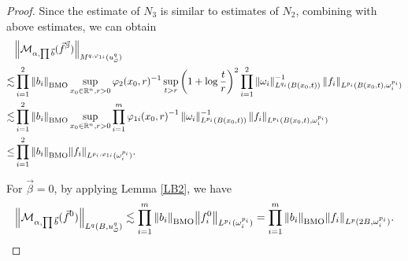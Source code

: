 \documentclass[11pt, twoside, leqno]{article}
\begin{document}
\begin{proof}[Proof]
	Since the estimate of $N_3$ is similar to estimates of $N_2$, combining with above estimates, we can obtain
	\begin{align}\label{ieq3}
	&{\left\| {{\mathcal{M}_{\alpha ,\prod {\vec b} }}({{\vec f}^{\vec \beta }})} \right\|_{{M^{q,{\varphi _{1i}}}}(u_{\vec \omega }^q)}}\notag\\
	\lesssim&\prod\limits_{i = 1}^2 {{{\left\| {{b_i}} \right\|}_{\rm BMO}}} \mathop {\sup }\limits_{{x_0} \in {\mathbb R^n},r > 0} {\varphi _2}{({x_0},r)^{ - 1}}\mathop {\sup }\limits_{t > r} {\left( {1 + \log \frac{t}{r}} \right)^2}\prod\limits_{i = 1}^2 {\left\| {{\omega _i}} \right\|_{{L^{{q_i}}}(B({x_0},t))}^{ - 1}{{\left\| {{f_i}} \right\|}_{{L^{{p_i}}}(B({x_0},t),\omega _i^{{p_i}})}}}\notag\\
	\lesssim&\prod\limits_{i = 1}^2 {{{\left\| {{b_i}} \right\|}_{\rm BMO}}} \mathop {\sup }\limits_{{x_0} \in {\mathbb R^n},r > 0} \prod\limits_{i = 1}^m {{\varphi _{1i}}{{({x_0},r)}^{ - 1}}\left\| {{\omega _i}} \right\|_{{L^{{p_i}}}(B({x_0},t))}^{ - 1}{{\left\| {{f_i}} \right\|}_{{L^{{p_i}}}(B({x_0},t),\omega _i^{{p_i}})}}}\notag\\
	\le&\prod\limits_{i = 1}^2 {{{\left\| {{b_i}} \right\|}_{\rm BMO}}{{\left\| {{f_i}} \right\|}_{{L^{{p_i},{\varphi _{1i}}}}(\omega _i^{{p_i}})}}}.
	\end{align}
	
	For $\vec \beta = 0$, by applying Lemma \ref{LB2}, we have
	\begin{equation*}
	{\left\| {{\mathcal{M}_{\alpha ,\prod {\vec b} }}({{\vec f}^0})} \right\|_{{L^q}(B,u_{\vec \omega }^q)}} \lesssim \prod\limits_{i = 1}^m {{{\left\| {{b_i}} \right\|}_{\rm BMO}}{{\left\| {f_i^0} \right\|}_{{L^{{p_i}}}(\omega _i^{{p_i}})}}}  = \prod\limits_{i = 1}^m {{{\left\| {{b_i}} \right\|}_{\rm BMO}}{{\left\| {{f_i}} \right\|}_{{L^p}(2B,\omega _i^{{p_i}})}}}.
	\end{equation*}


\end{proof}
\end{document}
